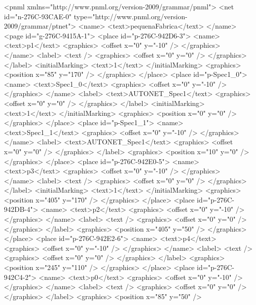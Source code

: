 <pnml xmlns="http://www.pnml.org/version-2009/grammar/pnml">
 <net id="n-276C-93CAE-0" type="http://www.pnml.org/version-2009/grammar/ptnet">
  <name>
   <text>pequenaFabrica</text>
  </name>
  <page id="g-276C-9415A-1">
   <place id="p-276C-942D6-3">
    <name>
     <text>p1</text>
     <graphics>
      <offset x="0" y="-10" />
     </graphics>
    </name>
    <label>
     <text />
     <graphics>
      <offset x="0" y="0" />
     </graphics>
    </label>
    <initialMarking>
     <text>1</text>
    </initialMarking>
    <graphics>
     <position x="85" y="170" />
    </graphics>
   </place>
   <place id="p-Spec1_0">
    <name>
     <text>Spec1_0</text>
     <graphics>
      <offset x="0" y="-10" />
     </graphics>
    </name>
    <label>
     <text>AUTONET_Spec1</text>
     <graphics>
      <offset x="0" y="0" />
     </graphics>
    </label>
    <initialMarking>
     <text>1</text>
    </initialMarking>
    <graphics>
     <position x="0" y="0" />
    </graphics>
   </place>
   <place id="p-Spec1_1">
    <name>
     <text>Spec1_1</text>
     <graphics>
      <offset x="0" y="-10" />
     </graphics>
    </name>
    <label>
     <text>AUTONET_Spec1</text>
     <graphics>
      <offset x="0" y="0" />
     </graphics>
    </label>
    <graphics>
     <position x="10" y="0" />
    </graphics>
   </place>
   <place id="p-276C-942E0-5">
    <name>
     <text>p3</text>
     <graphics>
      <offset x="0" y="-10" />
     </graphics>
    </name>
    <label>
     <text />
     <graphics>
      <offset x="0" y="0" />
     </graphics>
    </label>
    <initialMarking>
     <text>1</text>
    </initialMarking>
    <graphics>
     <position x="405" y="170" />
    </graphics>
   </place>
   <place id="p-276C-942DB-4">
    <name>
     <text>p2</text>
     <graphics>
      <offset x="0" y="-10" />
     </graphics>
    </name>
    <label>
     <text />
     <graphics>
      <offset x="0" y="0" />
     </graphics>
    </label>
    <graphics>
     <position x="405" y="50" />
    </graphics>
   </place>
   <place id="p-276C-942E2-6">
    <name>
     <text>p4</text>
     <graphics>
      <offset x="0" y="-10" />
     </graphics>
    </name>
    <label>
     <text />
     <graphics>
      <offset x="0" y="0" />
     </graphics>
    </label>
    <graphics>
     <position x="245" y="110" />
    </graphics>
   </place>
   <place id="p-276C-942C4-2">
    <name>
     <text>p0</text>
     <graphics>
      <offset x="0" y="-10" />
     </graphics>
    </name>
    <label>
     <text />
     <graphics>
      <offset x="0" y="0" />
     </graphics>
    </label>
    <graphics>
     <position x="85" y="50" />
